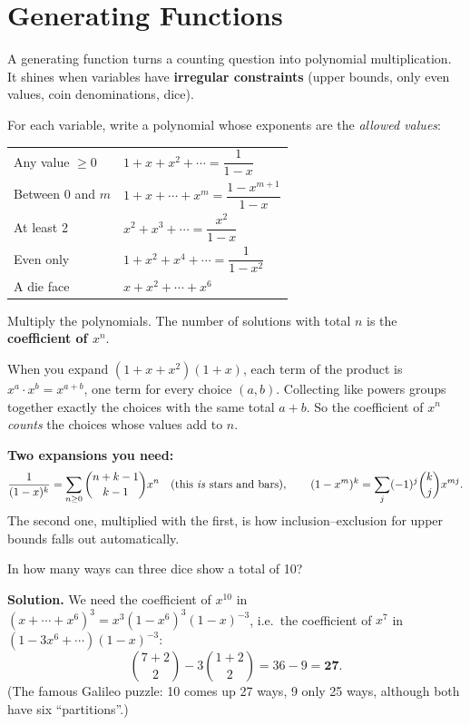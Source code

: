 \documentclass[11pt,a4paper,openany]{report}
\newcommand{\C}[2]{\binom{#1}{#2}}
\begin{document}
\chapter{Generating Functions}\label{ch:gf}

A generating function turns a counting question into polynomial multiplication. It shines when variables
have \textbf{irregular constraints} (upper bounds, only even values, coin denominations, dice).

\begin{idea}
For each variable, write a polynomial whose exponents are the \emph{allowed values}:
\begin{center}
\begin{tabular}{ll}
Any value $\ge0$ & $1+x+x^2+\cdots=\dfrac1{1-x}$\\
Between 0 and $m$ & $1+x+\cdots+x^m=\dfrac{1-x^{m+1}}{1-x}$\\
At least 2 & $x^2+x^3+\cdots=\dfrac{x^2}{1-x}$\\
Even only & $1+x^2+x^4+\cdots=\dfrac{1}{1-x^2}$\\
A die face & $x+x^2+\cdots+x^6$\\
\end{tabular}
\end{center}
Multiply the polynomials. The number of solutions with total $n$ is the \textbf{coefficient of $x^n$}.
\end{idea}

\begin{why}
When you expand $(1+x+x^2)(1+x)$, each term of the product is $x^{a}\cdot x^{b}=x^{a+b}$, one term for every
choice $(a,b)$. Collecting like powers groups together exactly the choices with the same total $a+b$. So
the coefficient of $x^n$ \emph{counts} the choices whose values add to $n$.
\end{why}

\textbf{Two expansions you need:}
\[\frac1{(1-x)^k}=\sum_{n\ge0}\C{n+k-1}{k-1}x^n \quad(\text{this \emph{is} stars and bars}),\qquad
(1-x^m)^k=\sum_j(-1)^j\C kj x^{mj}.\]
The second one, multiplied with the first, is how inclusion--exclusion for upper bounds falls out automatically.

\begin{example}
In how many ways can three dice show a total of 10?

\textbf{Solution.} We need the coefficient of $x^{10}$ in $(x+\cdots+x^6)^3=x^3(1-x^6)^3(1-x)^{-3}$, i.e.\ the
coefficient of $x^7$ in $(1-3x^6+\cdots)(1-x)^{-3}$:
\[\C{7+2}{2}-3\C{1+2}{2}=36-9=\mathbf{27}.\]
(The famous Galileo puzzle: 10 comes up 27 ways, 9 only 25 ways, although both have six ``partitions''.)
\end{example}
\end{document}
